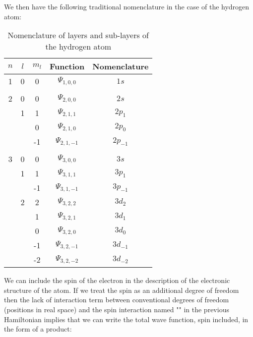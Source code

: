	We then have the following traditional nomenclature in the case of the hydrogen atom:
	\begin{table}[H]
	\begin{center}
			\begin{tabular}{|c|c|c|c|c|}
				\hline
				\multicolumn{1}{c}{\cellcolor{black!30}\textbf{$n$}} & 
  \multicolumn{1}{c}{\cellcolor{black!30}\textbf{$l$}} & 
  \multicolumn{1}{c}{\cellcolor{black!30}\textbf{$m_l$}}  & 
  \multicolumn{1}{c}{\cellcolor{black!30}Function} & 
  \multicolumn{1}{c}{\cellcolor{black!30}Nomenclature}\\ \hline
				1 & 0 & 0 & $\Psi_{1,0,0}$ & $1s$\\ \hline
				   &  &  &  & \\ \hline
				2 & 0 & 0 & $\Psi_{2,0,0}$ & $2s$\\ \hline
				   & 1 & 1 & $\Psi_{2,1,1}$ & $2p_1$\\ \hline
				   &   & 0 & $\Psi_{2,1,0}$ & $2p_0$\\ \hline
				   &   & -1 & $\Psi_{2,1,-1}$ & $2p_{-1}$\\ \hline
				   &  &  &  & \\ \hline
				3 & 0 & 0 & $\Psi_{3,0,0}$ & $3s$\\ \hline
				   & 1 & 1 & $\Psi_{3,1,1}$ & $3p_1$\\ \hline
				   &   & -1 & $\Psi_{3,1,-1}$ & $3p_{-1}$\\ \hline
				   &  2 & 2 & $\Psi_{3,2,2}$ & $3d_2$\\ \hline
				   &     & 1 & $\Psi_{3,2,1}$ & $3d_1$\\ \hline
				   &     & 0 & $\Psi_{3,2,0}$ & $3d_0$\\ \hline
				   &     & -1 & $\Psi_{3,2,-1}$ & $3d_{-1}$\\ \hline
				   &     & -2 & $\Psi_{3,2,-2}$ & $3d_{-2}$\\ \hline

		\end{tabular}
	\end{center}
	\caption{Nomenclature of layers and sub-layers of the hydrogen atom}
	\end{table}
	We can include the spin of the electron in the description of the electronic structure of the atom. If we treat the spin as an additional degree of freedom then the lack of interaction term between conventional degrees of freedom (positions in real space) and the spin interaction named "" in the previous Hamiltonian implies that we can write the total wave function, spin included, in the form of a product:
	
